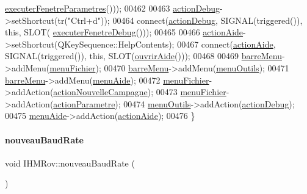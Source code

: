 \begin{DoxyCode}
      \hyperlink{class_i_h_m_rov_a2ec97de9b75c073c6a4dd0792a284002}{executerFenetreParametres}()));
00462 
00463     \hyperlink{class_i_h_m_rov_abf3ebd717e5d59355dd271917962083f}{actionDebug}->setShortcut(tr(\textcolor{stringliteral}{"Ctrl+d"}));
00464     connect(\hyperlink{class_i_h_m_rov_abf3ebd717e5d59355dd271917962083f}{actionDebug}, SIGNAL(triggered()), \textcolor{keyword}{this}, SLOT(
      \hyperlink{class_i_h_m_rov_a8931cade7a1613975da7174b5c2e84d2}{executerFenetreDebug}()));
00465 
00466     \hyperlink{class_i_h_m_rov_aecd3c0b54390e60f6e1ba14787c68828}{actionAide}->setShortcut(QKeySequence::HelpContents);
00467     connect(\hyperlink{class_i_h_m_rov_aecd3c0b54390e60f6e1ba14787c68828}{actionAide}, SIGNAL(triggered()), \textcolor{keyword}{this}, SLOT(\hyperlink{class_i_h_m_rov_a45a10161fde8c6373918ec30f16a8b5e}{ouvrirAide}()));
00468 
00469     \hyperlink{class_i_h_m_rov_a169e28bc630468d13c05de321f66ca3c}{barreMenu}->addMenu(\hyperlink{class_i_h_m_rov_ad110a9a5cfabc48491ee602075e28066}{menuFichier});
00470     \hyperlink{class_i_h_m_rov_a169e28bc630468d13c05de321f66ca3c}{barreMenu}->addMenu(\hyperlink{class_i_h_m_rov_aab4af4ee5ffb959869ee5f181fe4204e}{menuOutils});
00471     \hyperlink{class_i_h_m_rov_a169e28bc630468d13c05de321f66ca3c}{barreMenu}->addMenu(\hyperlink{class_i_h_m_rov_a7de335b17ef7b92fdb203cd385ba874f}{menuAide});
00472     \hyperlink{class_i_h_m_rov_ad110a9a5cfabc48491ee602075e28066}{menuFichier}->addAction(\hyperlink{class_i_h_m_rov_a1ea738e5224f6fa4fc61ac064b5d9a6e}{actionNouvelleCampagne});
00473     \hyperlink{class_i_h_m_rov_ad110a9a5cfabc48491ee602075e28066}{menuFichier}->addAction(\hyperlink{class_i_h_m_rov_aa1864bc274cc5662b212a3530255e4ad}{actionParametre});
00474     \hyperlink{class_i_h_m_rov_aab4af4ee5ffb959869ee5f181fe4204e}{menuOutils}->addAction(\hyperlink{class_i_h_m_rov_abf3ebd717e5d59355dd271917962083f}{actionDebug});
00475     \hyperlink{class_i_h_m_rov_a7de335b17ef7b92fdb203cd385ba874f}{menuAide}->addAction(\hyperlink{class_i_h_m_rov_aecd3c0b54390e60f6e1ba14787c68828}{actionAide});
00476 \}
\end{DoxyCode}
\mbox{\label{class_i_h_m_rov_a051d1d8d545e97c6b838df9054dddc6f}} 
\paragraph{\texorpdfstring{nouveau\+Baud\+Rate}{nouveauBaudRate}}
{\footnotesize\ttfamily void I\+H\+M\+Rov\+::nouveau\+Baud\+Rate (\begin{DoxyParamCaption}\item[{Q\+String}]{ }\end{DoxyParamCaption})\hspace{0.3cm}{\ttfamily [signal]}}



